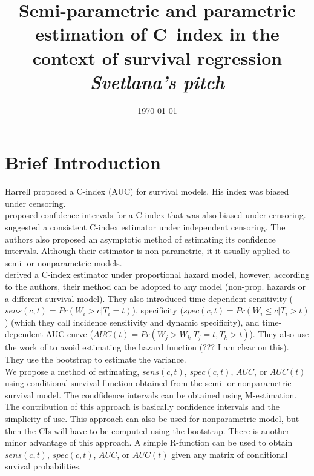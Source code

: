 \documentclass[]{article}\usepackage[]{graphicx}\usepackage[]{color}
\title{\textbf{\small{Semi-parametric and parametric estimation of C--index in the context of survival regression}}\\
\emph{\small{Svetlana's pitch}}}
\date{ \today}
\begin{document}
\maketitle

\linenumbers

\section{Brief Introduction}

Harrell proposed a C-index (AUC) for survival models. His index was biased under censoring.\\

\cite{pencina2004overall} proposed confidence intervals for a C-index that was also biased under censoring.\\

\cite{uno2011c} suggested a consistent C-index estimator under independent censoring. The authors also proposed an asymptotic method of estimating its confidence intervals. Although their estimator is non-parametric, it it usually applied to semi- or nonparametric models. \\

\cite{heagerty2005survival} derived a C-index estimator under proportional hazard model, however, according to the authors, their method can be adopted to any model (non-prop. hazards or a different survival model). They also introduced time dependent sensitivity ($sens(c, t) = Pr(W_i > c | T_i = t)$), specificity ($spec(c, t) = Pr(W_i \leq c | T_i > t)$) (which they call incidence sensitivity and dynamic specificity), and time-dependent AUC curve ($AUC(t) = Pr(W_j > W_k | T_j = t, T_k > t)$).
They also use the work of \cite{xu2000proportional} to avoid estimating the hazard function (??? I am clear on this). They use the bootstrap to estimate the variance.\\

We propose a method of estimating, $sens(c, t)$, $spec(c, t)$, $AUC$, or $AUC(t)$ using conditional survival function obtained from the semi- or nonparametric survival model. The condfidence intervals can be obtained using M-estimation. The contribution of this approach is basically confidence intervals and the simplicity of use. This approach can also be used for nonparametric model, but then the CIs will have to be computed using the bootstrap. There is another minor advantage of this approach. A simple R-function can be used to obtain $sens(c, t)$, $spec(c, t)$, $AUC$, or $AUC(t)$ given any matrix of conditional suvival probabilities. 
\end{document}

